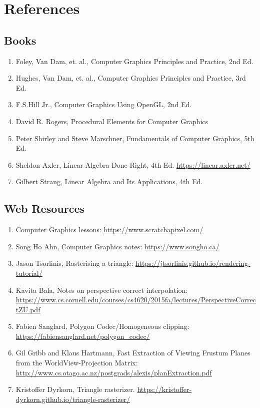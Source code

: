 \chapter{References}
\section{Books}
\begin{enumerate}
    \item Foley, Van Dam, et. al., Computer Graphics Principles and Practice, 2nd Ed. 
    \item Hughes, Van Dam, et. al., Computer Graphics Principles and Practice, 3rd Ed. 
    \item F.S.Hill Jr., Computer Graphics Using OpenGL, 2nd Ed.
    \item David R. Rogers, Procedural Elements for Computer Graphics
    \item Peter Shirley and Steve Marschner, Fundamentals of Computer Graphics, 5th Ed.
	\item Sheldon Axler, Linear Algebra Done Right, 4th Ed. \url{https://linear.axler.net/}
	\item Gilbert Strang, Linear Algebra and Its Applications, 4th Ed. 
\end{enumerate}

\section{Web Resources}
\begin{enumerate}
    \item Computer Graphics lessons: \url{https://www.scratchapixel.com/}
    \item Song Ho Ahn, Computer Graphics notes:  \url{https://www.songho.ca/}
     \item Jason Tsorlinis, Rasterising a triangle: \url{https://jtsorlinis.github.io/rendering-tutorial/}
     \item Kavita Bala, Notes on perspective correct interpolation: \url{https://www.cs.cornell.edu/courses/cs4620/2015fa/lectures/PerspectiveCorrectZU.pdf}
     \item Fabien Sanglard, Polygon Codec/Homogeneous clipping:  \url{https://fabiensanglard.net/polygon_codec/}
	 \item Gil Gribb and Klaus Hartmann, Fast Extraction of Viewing Frustum Planes from the WorldView-Projection Matrix: \url{http://www.cs.otago.ac.nz/postgrads/alexis/planExtraction.pdf}
	 \item Kristoffer Dyrkorn, Triangle rasterizer. \url{https://kristoffer-dyrkorn.github.io/triangle-rasterizer/}
\end{enumerate}


